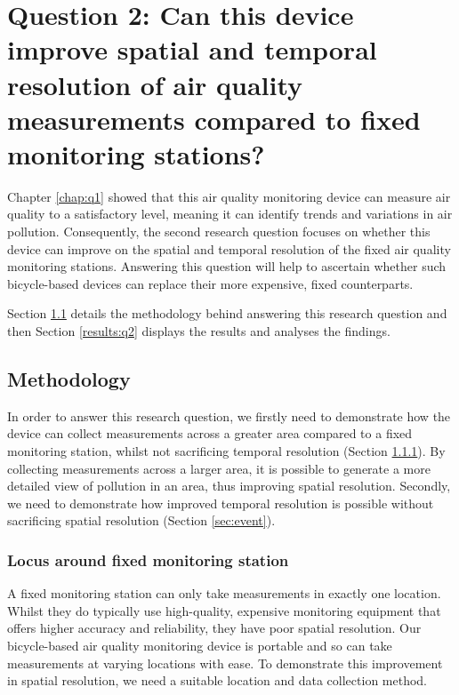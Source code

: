 \documentclass[11pt,twosided,a4paper]{report}
\begin{document}

\chapter[Improving spatial \& temporal resolution]{Question 2: Can this device improve spatial and temporal resolution of air quality measurements compared to fixed monitoring stations?}  \label{chap:q2}

Chapter \ref{chap:q1} showed that this air quality monitoring device can measure air quality to a satisfactory level, meaning it can identify trends and variations in air pollution. Consequently, the second research question focuses on whether this device can improve on the spatial and temporal resolution of the fixed air quality monitoring stations. Answering this question will help to ascertain whether such bicycle-based devices can replace their more expensive, fixed counterparts.

Section \ref{meth:q2} details the methodology behind answering this research question and then Section \ref{results:q2} displays the results and analyses the findings.

\section{Methodology} \label{meth:q2}

In order to answer this research question, we firstly need to demonstrate how the device can collect measurements across a greater area compared to a fixed monitoring station, whilst not sacrificing temporal resolution (Section \ref{sec:locus}). By collecting measurements across a larger area, it is possible to generate a more detailed view of pollution in an area, thus improving spatial resolution. Secondly, we need to demonstrate how improved temporal resolution is possible without sacrificing spatial resolution (Section \ref{sec:event}). 

\subsection{Locus around fixed monitoring station} \label{sec:locus}

A fixed monitoring station can only take measurements in exactly one location. Whilst they do typically use high-quality, expensive monitoring equipment that offers higher accuracy and reliability, they have poor spatial resolution. Our bicycle-based air quality monitoring device is portable and so can take measurements at varying locations with ease. To demonstrate this improvement in spatial resolution, we need a suitable location and data collection method. 
\end{document}

